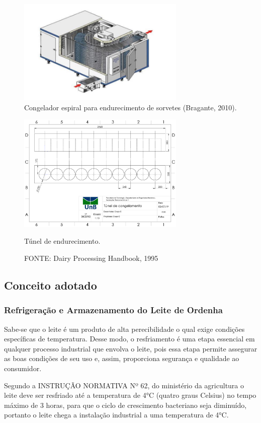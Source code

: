 \documentclass[10pt,a4paper]{article}
\begin{document}
\begin{figure}[h]
\centering
\includegraphics[width=8cm]{tunelendurecimento.jpg}
\caption{Congelador espiral para endurecimento de sorvetes (Bragante, 2010).}
\end{figure}

\begin{figure}[h]
\centering
\includegraphics[width=8cm]{tunel}
\caption{Túnel de endurecimento.}
\caption*{FONTE: Dairy Processing Handbook, 1995}
\end{figure}


\subsection{{ Conceito adotado}}


\subsubsection{{Refrigeração e Armazenamento do Leite de Ordenha}}

Sabe-se que o leite é um produto de alta perecibilidade o qual exige condições específicas de temperatura. Desse modo, o resfriamento é uma etapa essencial em qualquer processo industrial que envolva o leite, pois essa etapa permite assegurar as boas condições de seu uso e, assim, proporciona segurança e qualidade ao consumidor.

Segundo a INSTRUÇÃO NORMATIVA Nº 62, do ministério da agricultura o leite deve ser resfriado até a temperatura de 4°C (quatro graus Celsius) no tempo máximo de 3 horas, para que o ciclo de crescimento bacteriano seja diminuído, portanto o leite chega a instalação industrial a uma temperatura de 4°C.
\end{document}
